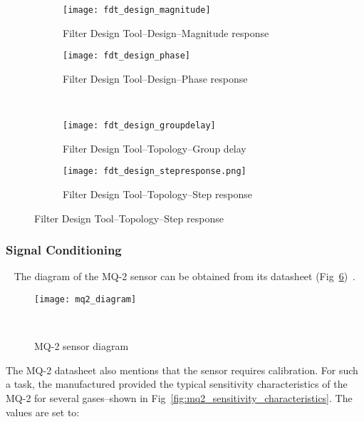 \begin{figure}[H]
    \centering
    \begin{subfigure}[t]{0.9\textwidth}
        \centering
        \texttt{[image: fdt\_design\_magnitude]}
        \caption{Filter Design Tool--Design--Magnitude response}
        \label{fig:fdt_design:magnitude}
    \end{subfigure}
    \begin{subfigure}[t]{0.9\textwidth}
        \centering
        \texttt{[image: fdt\_design\_phase]}
        \caption{Filter Design Tool--Design--Phase response}
        \label{fig:fdt_design:phase}
    \end{subfigure}
    \\
    \centering
    \begin{subfigure}[t]{0.9\textwidth}
        \centering
        \texttt{[image: fdt\_design\_groupdelay]}
        \caption{Filter Design Tool--Topology--Group delay}
        \label{fig:fdt_design:group_delay}
    \end{subfigure}
    \begin{subfigure}[t]{0.9\textwidth}
        \centering
        \texttt{[image: fdt\_design\_stepresponse.png]}
        \caption{Filter Design Tool--Topology--Step response}
        \label{fig:fdt_design:step_response}
    \end{subfigure}
    \label{fig:fdt_design}
\end{figure}


\subsubsection{Signal Conditioning}
~\label{sec:methodology:dev_methodology:sc}
\hspace{8pt}
The diagram of the MQ-2 sensor can be obtained from its datasheet (Fig~\ref{fig:mq2_diagram})~\cite{mq2_datasheet}.

\begin{figure}[H]
    \centering
    \texttt{[image: mq2\_diagram]}
    \caption{MQ-2 sensor diagram}
~\label{fig:mq2_diagram}
\end{figure}

The MQ-2 datasheet also mentions that the sensor requires calibration. For such a task, the manufactured provided the typical sensitivity characteristics of the MQ-2 for several gases--shown in Fig~\ref{fig:mq2_sensitivity_characteristics}. The values are set to:

